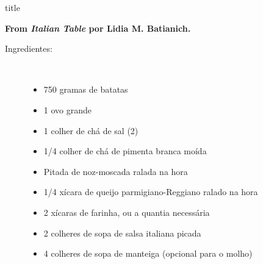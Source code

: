 \documentclass [11pt, letterpaper] {article}
\begin{document}
 {title}

\begin {flushright}
{\bf From {\it  Italian Table} por Lidia M. Batianich.}
\end {flushright}

\begin {description}

\item [Ingredientes:] \ \\
\begin {itemize}
\item 750 gramas de batatas 
\item 1 ovo grande
\item 1 colher de chá de sal (2)
\item 1/4 colher de chá de pimenta branca moída 
\item Pitada de noz-moscada ralada na hora
\item 1/4 xícara de queijo parmigiano-Reggiano ralado na hora
\item 2 xícaras de farinha, ou a quantia necessária
\item 2 colheres de sopa de salsa italiana picada
\item 4 colheres de sopa de manteiga (opcional para o molho)
\end {itemize}



\end{description}
\end{document}
